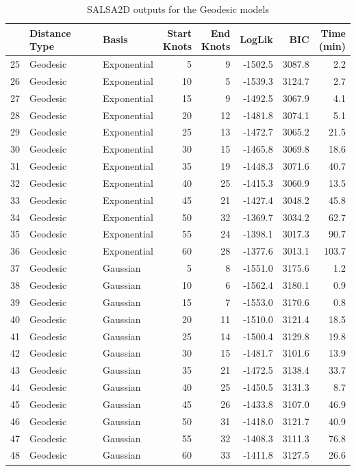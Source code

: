 \begin{table}[!htb]
\begin{tabular}{|l|l|l|r|r|r|r|r|}
\hline
  & Distance Type & Basis & \makecell[r]{Start \\Knots} & \makecell[l]{End \\Knots} & LogLik & BIC & \makecell[l]{Time \\(min)}\\
\hline
25 & Geodesic & Exponential & 5 & 9 & -1502.5 & 3087.8 & 2.2\\
\hline
26 & Geodesic & Exponential & 10 & 5 & -1539.3 & 3124.7 & 2.7\\
\hline
27 & Geodesic & Exponential & 15 & 9 & -1492.5 & 3067.9 & 4.1\\
\hline
28 & Geodesic & Exponential & 20 & 12 & -1481.8 & 3074.1 & 5.1\\
\hline
29 & Geodesic & Exponential & 25 & 13 & -1472.7 & 3065.2 & 21.5\\
\hline
30 & Geodesic & Exponential & 30 & 15 & -1465.8 & 3069.8 & 18.6\\
\hline
31 & Geodesic & Exponential & 35 & 19 & -1448.3 & 3071.6 & 40.7\\
\hline
32 & Geodesic & Exponential & 40 & 25 & -1415.3 & 3060.9 & 13.5\\
\hline
33 & Geodesic & Exponential & 45 & 21 & -1427.4 & 3048.2 & 45.8\\
\hline
34 & Geodesic & Exponential & 50 & 32 & -1369.7 & 3034.2 & 62.7\\
\hline
35 & Geodesic & Exponential & 55 & 24 & -1398.1 & 3017.3 & 90.7\\
\hline
36 & Geodesic & Exponential & 60 & 28 & -1377.6 & 3013.1 & 103.7\\
\hline
37 & Geodesic & Gaussian & 5 & 8 & -1551.0 & 3175.6 & 1.2\\
\hline
38 & Geodesic & Gaussian & 10 & 6 & -1562.4 & 3180.1 & 0.9\\
\hline
39 & Geodesic & Gaussian & 15 & 7 & -1553.0 & 3170.6 & 0.8\\
\hline
40 & Geodesic & Gaussian & 20 & 11 & -1510.0 & 3121.4 & 18.5\\
\hline
41 & Geodesic & Gaussian & 25 & 14 & -1500.4 & 3129.8 & 19.8\\
\hline
42 & Geodesic & Gaussian & 30 & 15 & -1481.7 & 3101.6 & 13.9\\
\hline
43 & Geodesic & Gaussian & 35 & 21 & -1472.5 & 3138.4 & 33.7\\
\hline
44 & Geodesic & Gaussian & 40 & 25 & -1450.5 & 3131.3 & 8.7\\
\hline
45 & Geodesic & Gaussian & 45 & 26 & -1433.8 & 3107.0 & 46.9\\
\hline
46 & Geodesic & Gaussian & 50 & 31 & -1418.0 & 3121.7 & 40.9\\
\hline
47 & Geodesic & Gaussian & 55 & 32 & -1408.3 & 3111.3 & 76.8\\
\hline
48 & Geodesic & Gaussian & 60 & 33 & -1411.8 & 3127.5 & 26.6\\
\hline
\end{tabular}
\caption{SALSA2D outputs for the Geodesic models}
\label{tab:outputsgeo}
\end{table}


